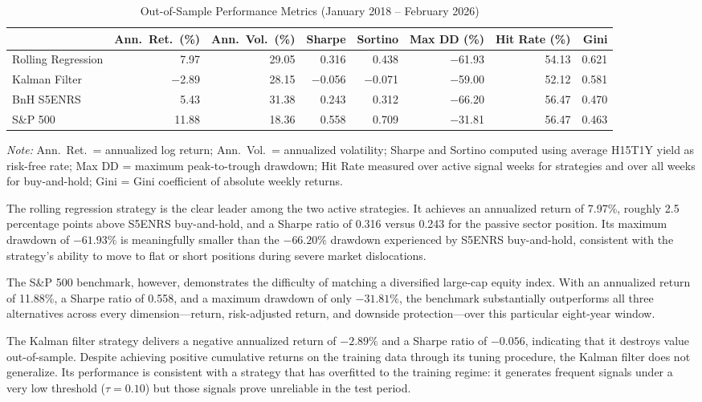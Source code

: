 \documentclass[12pt]{article}
\begin{document}
\begin{table}[H]
\centering
\caption{Out-of-Sample Performance Metrics (January 2018 – February 2026)}
\label{tab:performance}
\begin{tabular}{lrrrrrrr}
\toprule
 & Ann.\ Ret.\ (\%) & Ann.\ Vol.\ (\%) & Sharpe & Sortino & Max DD (\%) & Hit Rate (\%) & Gini \\
\midrule
Rolling Regression & 7.97 & 29.05 & 0.316 & 0.438 & $-$61.93 & 54.13 & 0.621 \\
Kalman Filter      & $-$2.89 & 28.15 & $-$0.056 & $-$0.071 & $-$59.00 & 52.12 & 0.581 \\
BnH S5ENRS         & 5.43 & 31.38 & 0.243 & 0.312 & $-$66.20 & 56.47 & 0.470 \\
S\&P 500           & 11.88 & 18.36 & 0.558 & 0.709 & $-$31.81 & 56.47 & 0.463 \\
\bottomrule
\end{tabular}

\smallskip
\footnotesize
\textit{Note:} Ann.\ Ret.\ = annualized log return; Ann.\ Vol.\ = annualized volatility; Sharpe and Sortino computed using average H15T1Y yield as risk-free rate; Max DD = maximum peak-to-trough drawdown; Hit Rate measured over active signal weeks for strategies and over all weeks for buy-and-hold; Gini = Gini coefficient of absolute weekly returns.
\end{table}

The rolling regression strategy is the clear leader among the two active strategies. It achieves an annualized return of 7.97\%, roughly 2.5 percentage points above S5ENRS buy-and-hold, and a Sharpe ratio of 0.316 versus 0.243 for the passive sector position. Its maximum drawdown of $-61.93\%$ is meaningfully smaller than the $-66.20\%$ drawdown experienced by S5ENRS buy-and-hold, consistent with the strategy's ability to move to flat or short positions during severe market dislocations.

The S\&P 500 benchmark, however, demonstrates the difficulty of matching a diversified large-cap equity index. With an annualized return of 11.88\%, a Sharpe ratio of 0.558, and a maximum drawdown of only $-31.81\%$, the benchmark substantially outperforms all three alternatives across every dimension—return, risk-adjusted return, and downside protection—over this particular eight-year window.

The Kalman filter strategy delivers a negative annualized return of $-2.89\%$ and a Sharpe ratio of $-0.056$, indicating that it destroys value out-of-sample. Despite achieving positive cumulative returns on the training data through its tuning procedure, the Kalman filter does not generalize. Its performance is consistent with a strategy that has overfitted to the training regime: it generates frequent signals under a very low threshold ($\tau = 0.10$) but those signals prove unreliable in the test period.
\end{document}
